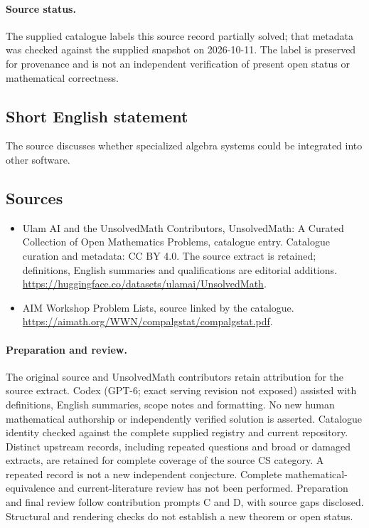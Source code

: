\documentclass[11pt]{article}
\begin{document}
\paragraph{Source status.}
The supplied catalogue labels this source record partially solved; that metadata was checked against the supplied snapshot on 2026-10-11. The label is preserved for provenance and is not an independent verification of present open status or mathematical correctness.
\subsection{Short English statement}
The source discusses whether specialized algebra systems could be integrated into other software.
\subsection{Sources}
\begin{itemize}
\item[\hypertarget{source:statement:1}{S1}] Ulam AI and the UnsolvedMath Contributors, UnsolvedMath: A Curated Collection of Open Mathematics Problems, catalogue entry. Catalogue curation and metadata: CC BY 4.0. The source extract is retained; definitions, English summaries and qualifications are editorial additions.
\url{https://huggingface.co/datasets/ulamai/UnsolvedMath}.
\item[\hypertarget{source:statement:2}{S2}] AIM Workshop Problem Lists, source linked by the catalogue.
\url{https://aimath.org/WWN/compalgstat/compalgstat.pdf}.
\end{itemize}
\paragraph{Preparation and review.}
The original source and UnsolvedMath contributors retain attribution for the source extract. Codex (GPT-6; exact serving revision not exposed) assisted with definitions, English summaries, scope notes and formatting. No new human mathematical authorship or independently verified solution is asserted. Catalogue identity checked against the complete supplied registry and current repository. Distinct upstream records, including repeated questions and broad or damaged extracts, are retained for complete coverage of the source CS category. A repeated record is not a new independent conjecture. Complete mathematical-equivalence and current-literature review has not been performed. Preparation and final review follow contribution prompts C and D, with source gaps disclosed. Structural and rendering checks do not establish a new theorem or open status.
\label{end:statement}
\end{document}
